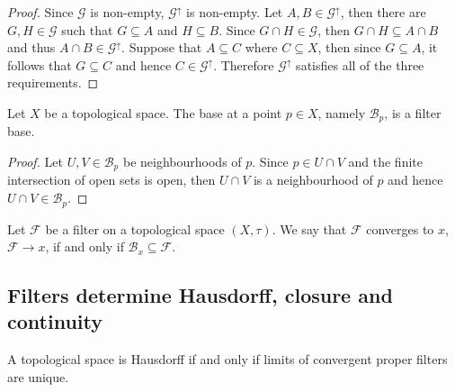 \begin{proof}
    Since \(\mathcal G\) is non-empty, \(\mathcal G^\uparrow\) is non-empty. Let
    \(A, B \in \mathcal G^\uparrow\), then there are \(G, H \in \mathcal G\) such
    that \(G \subseteq A\) and \(H \subseteq B\). Since \(G \cap H \in \mathcal
    G\), then \(G \cap H \subseteq A \cap B\) and thus \(A \cap B \in \mathcal
    G^\uparrow\). Suppose that \(A \subseteq C\) where \(C \subseteq X\), then
    since \(G \subseteq A\), it follows that \(G \subseteq C\) and hence \(C \in
    \mathcal G^\uparrow\). Therefore \(\mathcal G^\uparrow\) satisfies all of the
    three requirements.
\end{proof}

\begin{proposition}
    Let \(X\) be a topological space. The base at a point \(p \in X\), namely
    \(\mathcal B_p\), is a filter base.
\end{proposition}

\begin{proof}
    Let \(U, V \in \mathcal B_p\) be neighbourhoods of \(p\). Since \(p \in U \cap
    V\) and the finite intersection of open sets is open, then \(U \cap V\) is a
    neighbourhood of \(p\) and hence \(U \cap V \in \mathcal B_p\).
\end{proof}

\begin{definition}
    \label{def: convergence of filters}
    Let \(\mathcal F\) be a filter on a topological space \((X, \tau)\). We
    say that \(\mathcal F\) converges to \(x\), \(\mathcal F \to x\), if and only
    if \(\mathcal B_x \subseteq \mathcal F\).
\end{definition}

\subsection{Filters determine Hausdorff, closure and continuity}

\begin{proposition}[Hausdorff]\label{prop: hausdorff from filter}
    A topological space is Hausdorff if and only if limits of convergent proper
    filters are unique.
\end{proposition}

